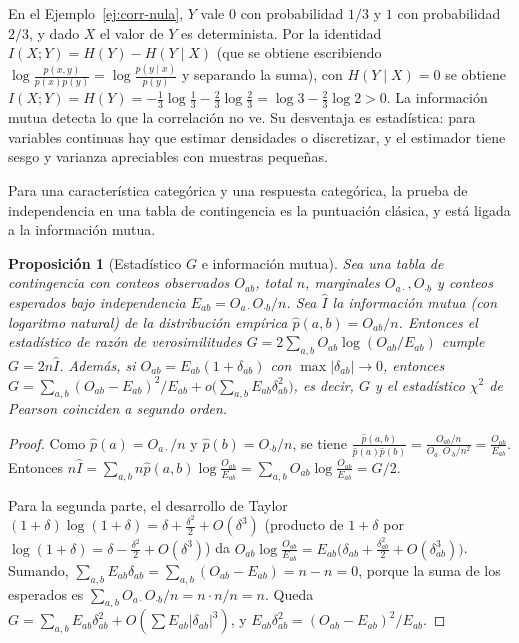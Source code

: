 \documentclass[11pt]{article}
\newtheorem{proposicion}[teorema]{Proposición}
\theoremstyle{definition}
\theoremstyle{remark}
\newcommand{\abs}[1]{\left\lvert #1\right\rvert}
\begin{document}
\noindent En el Ejemplo~\ref{ej:corr-nula}, $Y$ vale $0$ con probabilidad $1/3$ y $1$ con probabilidad $2/3$, y dado $X$ el valor de $Y$ es determinista. Por la identidad $I(X;Y)=H(Y)-H(Y\mid X)$ (que se obtiene escribiendo $\log\frac{p(x,y)}{p(x)p(y)}=\log\frac{p(y\mid x)}{p(y)}$ y separando la suma), con $H(Y\mid X)=0$ se obtiene $I(X;Y)=H(Y)=-\frac13\log\frac13-\frac23\log\frac23=\log3-\frac23\log2>0$. La información mutua detecta lo que la correlación no ve. Su desventaja es estadística: para variables continuas hay que estimar densidades o discretizar, y el estimador tiene sesgo y varianza apreciables con muestras pequeñas.

\medskip

\noindent Para una característica categórica y una respuesta categórica, la prueba de independencia en una tabla de contingencia es la puntuación clásica, y está ligada a la información mutua.

\begin{proposicion}[Estadístico $G$ e información mutua]\label{prop:g-im}
\noindent Sea una tabla de contingencia con conteos observados $O_{ab}$, total $n$, marginales $O_{a\cdot},O_{\cdot b}$ y conteos esperados bajo independencia $E_{ab}=O_{a\cdot}O_{\cdot b}/n$. Sea $\hat I$ la información mutua (con logaritmo natural) de la distribución empírica $\hat p(a,b)=O_{ab}/n$. Entonces el estadístico de razón de verosimilitudes $G=2\sum_{a,b}O_{ab}\log(O_{ab}/E_{ab})$ cumple $G=2n\hat I$. Además, si $O_{ab}=E_{ab}(1+\delta_{ab})$ con $\max\abs{\delta_{ab}}\to0$, entonces $G=\sum_{a,b}(O_{ab}-E_{ab})^2/E_{ab}+o\big(\sum_{a,b}E_{ab}\delta_{ab}^2\big)$, es decir, $G$ y el estadístico $\chi^2$ de Pearson coinciden a segundo orden.
\end{proposicion}
\begin{proof}
\noindent Como $\hat p(a)=O_{a\cdot}/n$ y $\hat p(b)=O_{\cdot b}/n$, se tiene $\frac{\hat p(a,b)}{\hat p(a)\hat p(b)}=\frac{O_{ab}/n}{O_{a\cdot}O_{\cdot b}/n^2}=\frac{O_{ab}}{E_{ab}}$. Entonces $n\hat I=\sum_{a,b}n\hat p(a,b)\log\frac{O_{ab}}{E_{ab}}=\sum_{a,b}O_{ab}\log\frac{O_{ab}}{E_{ab}}=G/2$.

\medskip

\noindent Para la segunda parte, el desarrollo de Taylor $(1+\delta)\log(1+\delta)=\delta+\frac{\delta^2}{2}+O(\delta^3)$ (producto de $1+\delta$ por $\log(1+\delta)=\delta-\frac{\delta^2}2+O(\delta^3)$) da $O_{ab}\log\frac{O_{ab}}{E_{ab}}=E_{ab}\big(\delta_{ab}+\frac{\delta_{ab}^2}{2}+O(\delta_{ab}^3)\big)$. Sumando, $\sum_{a,b}E_{ab}\delta_{ab}=\sum_{a,b}(O_{ab}-E_{ab})=n-n=0$, porque la suma de los esperados es $\sum_{a,b}O_{a\cdot}O_{\cdot b}/n=n\cdot n/n=n$. Queda $G=\sum_{a,b}E_{ab}\delta_{ab}^2+O(\sum E_{ab}\abs{\delta_{ab}}^3)$, y $E_{ab}\delta_{ab}^2=(O_{ab}-E_{ab})^2/E_{ab}$.
\end{proof}
\end{document}
